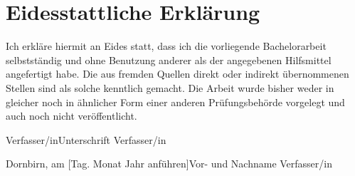 \chapter*{Eidesstattliche Erklärung}
Ich erkläre hiermit an Eides statt, dass ich die vorliegende Bachelorarbeit selbstständig und ohne Benutzung anderer als der angegebenen Hilfsmittel angefertigt habe. Die aus fremden Quellen direkt oder indirekt übernommenen Stellen sind als solche kenntlich gemacht. Die Arbeit wurde bisher weder in gleicher noch in ähnlicher Form einer anderen Prüfungsbehörde vorgelegt und auch noch nicht veröffentlicht.

\vspace{30mm}
\noindent
Verfasser/in\hfill                                       Unterschrift Verfasser/in

\vspace{3mm}
\noindent
Dornbirn, am [Tag. Monat Jahr anführen]\hfill            Vor- und Nachname Verfasser/in
